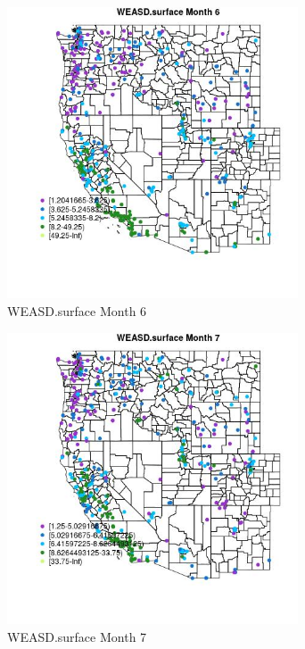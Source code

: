 \begin{figure} 
\centering  
\includegraphics[width=0.77\textwidth]{Code_Outputs/ML_input_report_ML_input_PM25_Step5_part_d_de_duplicated_aves_ML_input_MapObsMo6WEASDsurface.jpg} 
\caption{\label{fig:ML_input_report_ML_input_PM25_Step5_part_d_de_duplicated_aves_ML_inputMapObsMo6WEASDsurface}WEASD.surface Month 6} 
\end{figure} 
 

\begin{figure} 
\centering  
\includegraphics[width=0.77\textwidth]{Code_Outputs/ML_input_report_ML_input_PM25_Step5_part_d_de_duplicated_aves_ML_input_MapObsMo7WEASDsurface.jpg} 
\caption{\label{fig:ML_input_report_ML_input_PM25_Step5_part_d_de_duplicated_aves_ML_inputMapObsMo7WEASDsurface}WEASD.surface Month 7} 
\end{figure} 
 

